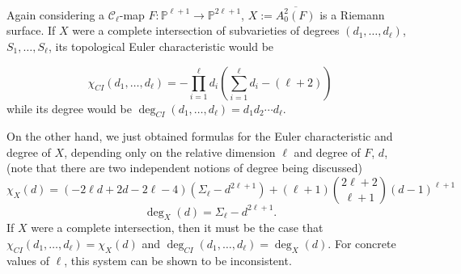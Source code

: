 \documentclass[11pt]{article}
\theoremstyle{plain}
\theoremstyle{definition}
\theoremstyle{definition}
\begin{document}
Again considering a $\mathcal C_\ell$-map $F: \mathbb P^{\ell+1}\to \mathbb P^{2\ell+1}$, $X:=\overline{A_0^2(F)}$ is a Riemann surface. If $X$ were a complete intersection of subvarieties of degrees $(d_1,\dots,d_\ell)$, $S_1,\dots,S_\ell$, its topological Euler characteristic would be 

\[
\chi_{CI}(d_1,\dots,d_\ell) = -\prod_{i=1}^\ell d_i \left(\sum_{i=1}^\ell d_i-(\ell+2)\right)
\]
while its degree would be $\deg_{CI}(d_1,\dots,d_\ell)=d_1d_2\cdots d_\ell$.

On the other hand, we just obtained formulas for the Euler characteristic and degree of $X$, depending only on the relative dimension $\ell$ and degree of $F$, $d$, (note that there are two independent notions of degree being discussed)
\[
\chi_X(d) = (-2\ell d+2d-2\ell -4)(\Sigma_\ell-d^{2\ell+1})+(\ell+1){2\ell+2\choose \ell+1}(d-1)^{\ell+1}
\]
\[
\deg_X(d)=\Sigma_\ell-d^{2\ell+1}.
\]
If $X$ were a complete intersection, then it must be the case that $\chi_{CI}(d_1,\dots,d_\ell) = \chi_X(d)$ and $\deg_{CI}(d_1,\dots,d_\ell) = \deg_X(d)$. For concrete values of $\ell$, this system can be shown to be inconsistent.
\end{document}
